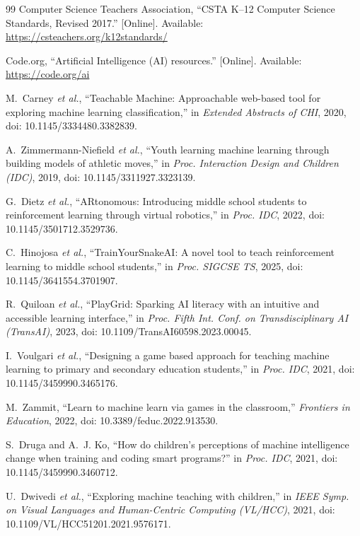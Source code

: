 \documentclass[conference]{IEEEtran}
\begin{document}
\begin{thebibliography}{99}
Computer Science Teachers Association,
``CSTA K--12 Computer Science Standards, Revised 2017.''
[Online]. Available: \url{https://csteachers.org/k12standards/}

Code.org, ``Artificial Intelligence (AI) resources.''
[Online]. Available: \url{https://code.org/ai}

M.~Carney \emph{et al.},
``Teachable Machine: Approachable web-based tool for exploring machine learning classification,''
in \emph{Extended Abstracts of CHI}, 2020, doi: 10.1145/3334480.3382839.

A.~Zimmermann-Niefield \emph{et al.},
``Youth learning machine learning through building models of athletic moves,''
in \emph{Proc. Interaction Design and Children (IDC)}, 2019, doi: 10.1145/3311927.3323139.

G.~Dietz \emph{et al.},
``ARtonomous: Introducing middle school students to reinforcement learning through virtual robotics,''
in \emph{Proc. IDC}, 2022, doi: 10.1145/3501712.3529736.

C.~Hinojosa \emph{et al.},
``TrainYourSnakeAI: A novel tool to teach reinforcement learning to middle school students,''
in \emph{Proc. SIGCSE TS}, 2025, doi: 10.1145/3641554.3701907.

R.~Quiloan \emph{et al.},
``PlayGrid: Sparking AI literacy with an intuitive and accessible learning interface,''
in \emph{Proc. Fifth Int. Conf. on Transdisciplinary AI (TransAI)}, 2023, doi: 10.1109/TransAI60598.2023.00045.

I.~Voulgari \emph{et al.},
``Designing a game based approach for teaching machine learning to primary and secondary education students,''
in \emph{Proc. IDC}, 2021, doi: 10.1145/3459990.3465176.

M.~Zammit,
``Learn to machine learn via games in the classroom,''
\emph{Frontiers in Education}, 2022, doi: 10.3389/feduc.2022.913530.

S.~Druga and A.~J. Ko,
``How do children’s perceptions of machine intelligence change when training and coding smart programs?''
in \emph{Proc. IDC}, 2021, doi: 10.1145/3459990.3460712.

U.~Dwivedi \emph{et al.},
``Exploring machine teaching with children,''
in \emph{IEEE Symp. on Visual Languages and Human-Centric Computing (VL/HCC)}, 2021, doi: 10.1109/VL/HCC51201.2021.9576171.


\end{thebibliography}
\end{document}
